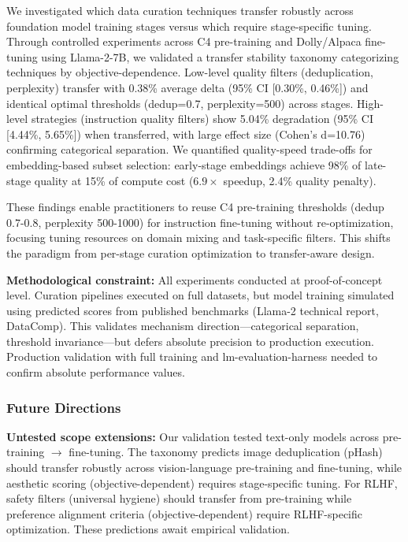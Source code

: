 
We investigated which data curation techniques transfer robustly across foundation model training stages versus which require stage-specific tuning. Through controlled experiments across C4 pre-training and Dolly/Alpaca fine-tuning using Llama-2-7B, we validated a transfer stability taxonomy categorizing techniques by objective-dependence. Low-level quality filters (deduplication, perplexity) transfer with 0.38\% average delta (95\% CI [0.30\%, 0.46\%]) and identical optimal thresholds (dedup=0.7, perplexity=500) across stages. High-level strategies (instruction quality filters) show 5.04\% degradation (95\% CI [4.44\%, 5.65\%]) when transferred, with large effect size (Cohen's d=10.76) confirming categorical separation. We quantified quality-speed trade-offs for embedding-based subset selection: early-stage embeddings achieve 98\% of late-stage quality at 15\% of compute cost (6.$9\times$ speedup, 2.4\% quality penalty).

These findings enable practitioners to reuse C4 pre-training thresholds (dedup 0.7-0.8, perplexity 500-1000) for instruction fine-tuning without re-optimization, focusing tuning resources on domain mixing and task-specific filters. This shifts the paradigm from per-stage curation optimization to transfer-aware design.

\textbf{Methodological constraint:} All experiments conducted at proof-of-concept level. Curation pipelines executed on full datasets, but model training simulated using predicted scores from published benchmarks (Llama-2 technical report, DataComp). This validates mechanism direction---categorical separation, threshold invariance---but defers absolute precision to production execution. Production validation with full training and lm-evaluation-harness needed to confirm absolute performance values.

\subsubsection{Future Directions}

\textbf{Untested scope extensions:} Our validation tested text-only models across pre-training $\rightarrow$ fine-tuning. The taxonomy predicts image deduplication (pHash) should transfer robustly across vision-language pre-training and fine-tuning, while aesthetic scoring (objective-dependent) requires stage-specific tuning. For RLHF, safety filters (universal hygiene) should transfer from pre-training while preference alignment criteria (objective-dependent) require RLHF-specific optimization. These predictions await empirical validation.

